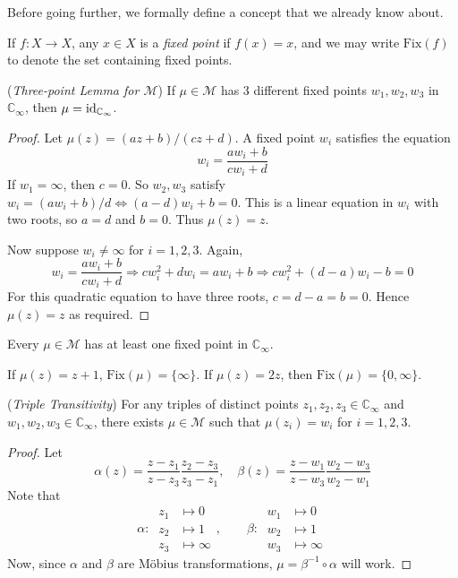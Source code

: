 \documentclass[10pt, a4paper, twoside]{report}
\begin{document}
Before going further, we formally define a concept that we already know about. 
\begin{definition}
    If \(f:X\to X\), any \(x\in X\) is a \emph{fixed point} if \(f(x)=x\), and we may write \(\mathrm{Fix}(f)\) to denote the set containing fixed points.
\end{definition}
\begin{lemma}
    (\emph{Three-point Lemma for \(\mathcal{M}\)}) If \(\mu\in\mathcal{M}\) has 3 different fixed points \(w_1,w_2,w_3\) in \(\mathbb{C}_\infty\), then \(\mu=\operatorname{id}_{\mathbb{C}_\infty}\).
    \label{lemma:3point_mobius}
\end{lemma}
\begin{proof}
    Let \(\mu(z)=(az+b)/(cz+d)\). A fixed point \(w_i\) satisfies the equation 
    \[w_i=\frac{aw_i+b}{cw_i+d}\]
    If \(w_1=\infty\), then \(c=0\). So \(w_2,w_3\) satisfy \(w_i=(aw_i+b)/d\Leftrightarrow (a-d)w_i+b=0\). This is a linear equation in \(w_i\) with two roots, so \(a=d\) and \(b=0\). Thus \(\mu(z)=z\).

    Now suppose \(w_i\neq\infty\) for \(i=1,2,3\). Again, 
    \[w_i=\frac{aw_i+b}{cw_i+d}\Rightarrow cw_i^2+dw_i=aw_i+b\Rightarrow cw_i^2+(d-a)w_i-b=0\]
    For this quadratic equation to have three roots, \(c=d-a=b=0\). Hence \(\mu(z)=z\) as required.
\end{proof}
\begin{example}
    Every \(\mu\in\mathcal{M}\) has at least one fixed point in \(\mathbb{C}_\infty\).
\end{example}
\begin{example}
    If \(\mu(z)=z+1\), \(\mathrm{Fix}(\mu)=\{\infty\}\). If \(\mu(z)=2z\), then \(\mathrm{Fix}(\mu)=\{0,\infty\}\).
\end{example}
\begin{lemma}
    (\emph{Triple Transitivity}) For any triples of distinct points \(z_1,z_2,z_3\in\mathbb{C}_\infty\) and \(w_1,w_2,w_3\in\mathbb{C}_\infty\), there exists \(\mu\in\mathcal{M}\) such that \(\mu(z_i)=w_i\) for \(i=1,2,3\).
    \label{lemma:triple_trans}
\end{lemma}
\begin{proof}
    Let 
    \[\alpha(z)=\frac{z-z_1}{z-z_3}\frac{z_2-z_3}{z_3-z_1},\quad\beta(z)=\frac{z-w_1}{z-w_3}\frac{w_2-w_3}{w_2-w_1}\]
    Note that 
    \[\alpha:\:\begin{aligned}
        z_1&\mapsto 0 \\
        z_2&\mapsto 1 \\
        z_3&\mapsto\infty
    \end{aligned},\qquad\beta:\:\begin{aligned}
        w_1&\mapsto 0 \\
        w_2&\mapsto 1 \\
        w_3&\mapsto\infty
    \end{aligned}\]
    Now, since \(\alpha\) and \(\beta\) are Möbius transformations, \(\mu=\beta^{-1}\circ\alpha\) will work.
\end{proof}
\end{document}
